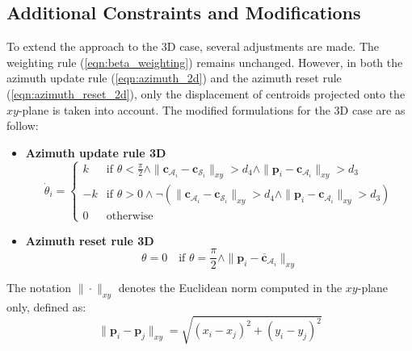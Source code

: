     \subsection{Additional Constraints and Modifications}
        To extend the approach to the \ac{3D} case, several adjustments are made.
        The weighting rule (\ref{eqn:beta_weighting}) remains unchanged. 
        However, in both the azimuth update rule (\ref{eqn:azimuth_2d}) and the azimuth reset rule (\ref{eqn:azimuth_reset_2d}), only the displacement of centroids projected onto the $xy$-plane is taken into account.
        The modified formulations for the \ac{3D} case are as follow:
        \begin{itemize}
            \item \textbf{Azimuth update rule \ac{3D}}
                \begin{equation}
                    \label{eqn:azimuth_3d}
                    \dot{\theta}_i = 
                    \begin{cases}
                        k  & \text{if } \theta < \frac{\pi}{2} \land \|\mathbf{c}_{\mathcal{A}_i} - \mathbf{c}_{\mathcal{S}_i}\|_{xy} > d_4 \land \|\mathbf{p}_i - \mathbf{c}_{\mathcal{A}_i}\|_{xy} > d_3 \\
                        -k & \text{if } \theta > 0 \land \neg (\|\mathbf{c}_{\mathcal{A}_i} - \mathbf{c}_{\mathcal{S}_i}\|_{xy} > d_4 \land \|\mathbf{p}_i - \mathbf{c}_{\mathcal{A}_i}\|_{xy} > d_3) \\
                        0  & \text{otherwise}
                    \end{cases}
                \end{equation}
            \item \textbf{Azimuth reset rule \ac{3D}}
                \begin{equation}
                    \label{eqn:azimuth_reset_3d}
                    \theta = 0 \quad \text{if } \theta = \frac{\pi}{2} \land \| \mathbf{p}_i - \mathbf{\overline{c}}_{\mathcal{A}_i} \|_{xy}    
                \end{equation}
        \end{itemize}

        The notation $\| \cdot \|_{xy}$ denotes the Euclidean norm computed in the $xy$-plane only, defined as:
        \begin{equation}
            \| \mathbf{p}_i - \mathbf{p}_j \|_{xy} = \sqrt{(x_i - x_j)^2 + (y_i - y_j)^2}
        \end{equation}



